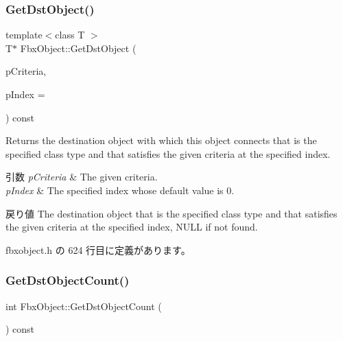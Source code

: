 \subsubsection{\texorpdfstring{Get\+Dst\+Object()}{GetDstObject()}\hspace{0.1cm}{\footnotesize\ttfamily [4/4]}}
{\footnotesize\ttfamily template$<$class T $>$ \\
T$\ast$ Fbx\+Object\+::\+Get\+Dst\+Object (\begin{DoxyParamCaption}\item[{const \hyperlink{class_fbx_criteria}{Fbx\+Criteria} \&}]{p\+Criteria,  }\item[{int}]{p\+Index = {} }\end{DoxyParamCaption}) const\hspace{0.3cm}{\ttfamily [inline]}}

Returns the destination object with which this object connects that is the specified class type and that satisfies the given criteria at the specified index. 
\begin{DoxyParams}{引数}
{\em p\+Criteria} & The given criteria. \\
\hline
{\em p\+Index} & The specified index whose default value is 0. \\
\hline
\end{DoxyParams}
\begin{DoxyReturn}{戻り値}
The destination object that is the specified class type and that satisfies the given criteria at the specified index, N\+U\+LL if not found. 
\end{DoxyReturn}


 fbxobject.\+h の 624 行目に定義があります。

\mbox{\label{class_fbx_object_a5be091701bfa94643dc2333768f56866}} 
\subsubsection{\texorpdfstring{Get\+Dst\+Object\+Count()}{GetDstObjectCount()}\hspace{0.1cm}{\footnotesize\ttfamily [1/4]}}
{\footnotesize\ttfamily int Fbx\+Object\+::\+Get\+Dst\+Object\+Count (\begin{DoxyParamCaption}{ }\end{DoxyParamCaption}) const\hspace{0.3cm}{\ttfamily [inline]}}

